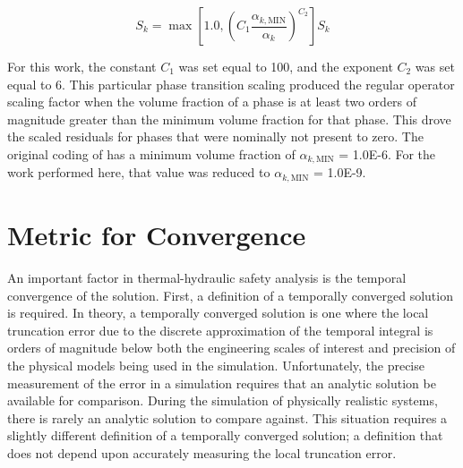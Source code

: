 \begin{equation}
\label{eqn:scaling_factor_small}
S_k = \max[1.0, \left(C_1 \frac{\alpha_{k,\text{MIN}}}{\alpha_k}\right)^{C_2} ] S_k
\end{equation}

For this work, the constant $C_1$ was set equal to 100, and the exponent $C_2$ was set equal to 6.
This particular phase transition scaling produced the regular operator scaling factor when the volume fraction of a phase is at least two orders of magnitude greater than the minimum volume fraction for that phase.
This drove the scaled residuals for phases that were nominally not present to zero.
The original coding of \cobra{} has a minimum volume fraction of $\alpha_{k,\text{MIN}}$ = 1.0E-6.
For the work performed here, that value was reduced to $\alpha_{k,\text{MIN}}$ = 1.0E-9.

\section{Metric for Convergence}
\label{sect:temporal_convergence}

An important factor in thermal-hydraulic safety analysis is the temporal convergence of the solution.
First, a definition of a temporally converged solution is required.
In theory, a temporally converged solution is one where the local truncation error due to the discrete approximation of the temporal integral is orders of magnitude below both the engineering scales of interest and precision of the physical models being used in the simulation.
Unfortunately, the precise measurement of the error in a simulation requires that an analytic solution be available for comparison.
During the simulation of physically realistic systems, there is rarely an analytic solution to compare against.
This situation requires a slightly different definition of a temporally converged solution; a definition that does not depend upon accurately measuring the local truncation error.

